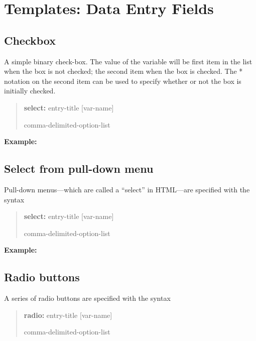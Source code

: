 \documentclass[letterpaper,10pt,english]{sphinxmanual}
\begin{document}
\section{Templates: Data Entry Fields}
\label{forms:templates-data-entry-fields}

\subsection{Checkbox}
\label{forms:checkbox}
A simple binary check-box. The value of the variable will be first item
in the list when the box is not checked; the second item when the box is
checked. The * notation on the second item can be used to specify
whether or not the box is initially checked.
\begin{quote}

\begin{DUlineblock}{0em}
\item[] \textbf{select:} entry-title {[}var-name{]}
\item[] comma-delimited-option-list
\end{DUlineblock}
\end{quote}

\textbf{Example:}
\begin{quote}

\end{quote}


\subsection{Select from pull-down menu}
\label{forms:select-from-pull-down-menu}
Pull-down menus—which are called a “select” in HTML—are specified with
the syntax
\begin{quote}

\begin{DUlineblock}{0em}
\item[] \textbf{select:} entry-title {[}var-name{]}
\item[] comma-delimited-option-list
\end{DUlineblock}
\end{quote}

\textbf{Example:}
\begin{quote}

\end{quote}


\subsection{Radio buttons}
\label{forms:radio-buttons}
A series of radio buttons are specified with the syntax
\begin{quote}

\begin{DUlineblock}{0em}
\item[] \textbf{radio:} entry-title {[}var-name{]}
\item[] comma-delimited-option-list
\end{DUlineblock}
\end{quote}
\end{document}

